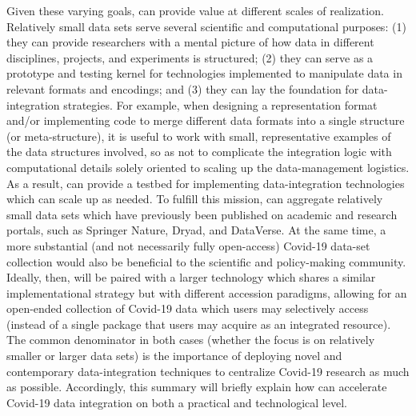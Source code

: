 \documentclass[11pt,letterpaper]{article}
\newcommand{\ATextCClr}[1]{\textcolor{atcColor}{\textbf{#1}}}
\newcommand{\CRtwo}{{\resizebox{!}{7.5pt}{\ATextCClr{CR2}}}}
\newcommand{\p}[1]{

\vspace{1em}#1}
\begin{document}
{\p{Given these varying goals, \CRtwo{} can provide value at different 
scales of realization.  Relatively small data 
sets serve several scientific and computational 
purposes: (1) they can provide researchers 
with a mental picture of how data in different 
disciplines, projects, and experiments is structured; 
(2) they can serve as a prototype and testing 
kernel for technologies implemented to manipulate 
data in relevant formats and encodings; and 
(3) they can lay the foundation for data-integration 
strategies.  For example, when designing a 
representation format and/or implementing code 
to merge different data formats into a single 
structure (or meta-structure), it is useful 
to work with small, representative examples 
of the data structures involved, so as not 
to complicate the integration logic with 
computational details solely oriented to 
scaling up the data-management logistics.  
As a result, \CRtwo{} can provide a 
testbed for implementing data-integration 
technologies which can scale up as needed.  
To fulfill this mission, \CRtwo{} can aggregate 
relatively small data sets which have 
previously been published on academic and research 
portals, such as Springer Nature, Dryad, and DataVerse.  
At the same time, a more substantial 
(and not necessarily fully open-access) Covid-19 
data-set collection would also be beneficial to the 
scientific and policy-making community.  Ideally, then, 
\CRtwo{} will be paired with a larger technology which shares 
a similar implementational strategy but with different 
accession paradigms, allowing for an open-ended 
collection of Covid-19 data which users may 
selectively access (instead of a single package 
that users may acquire as an integrated resource).  
The common denominator in both cases 
(whether the focus is on relatively smaller or 
larger data sets) is the 
importance of deploying novel and contemporary 
data-integration techniques to centralize 
Covid-19 research as much as possible.  
Accordingly, this summary will briefly explain 
how \CRtwo{} can accelerate Covid-19 data integration 
on both a practical and technological level.}
 
}
\end{document}
